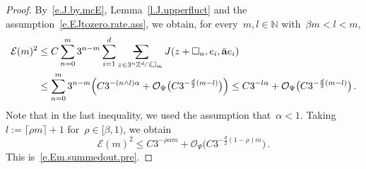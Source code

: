 \documentclass[11pt,twoside]{article} %
\makeatletter
\let\oldsquare\square %
\renewcommand{\square}{\oldsquare}
\numberwithin{equation}{section}
\theoremstyle{definition}
\newcommand*{\N}{\ensuremath{\mathbb{N}}}
\newcommand*{\Zd}{\ensuremath{\mathbb{Z}^d}}
\renewcommand{\a}{\mathbf{a}}
\newcommand{\ahom}{\bar{\a}}
\newcommand{\cu}{\square}
\renewcommand{\O}{\mathcal{O}}
\newcommand{\avsum}{\mathop{\mathpalette\avsuminner\relax}\displaylimits}
\newcommand\avsuminner[2]{%
  {\sbox0{$\m@th#1\sum$}%
   \vphantom{\usebox0}%
   \ooalign{%
     \hidewidth
     \smash{\,\rule[.23em]{8.8pt}{1.1pt} \relax}%
     \hidewidth\cr
   ~$\m@th#1\sum$\cr
   }%
  }%
}
\makeatother
\begin{document}
\begin{proof}
By~\eqref{e.J.by.mcE}, Lemma~\ref{l.J.upperfluct} and the assumption~\eqref{e.EJtozero.rate.ass}, we obtain, for every~$m,l \in \N$ with~$\beta m < l < m$,
\begin{align}
\label{e.Emestimate}
\mathcal{E}(m)^2
&
\leq
C\sum_{n=0}^{m}
3^{n-m} \sum_{i=1}^d \avsum_{z \in 3^n\Zd\cap \cu_m} 
 J(z+\cu_n,e_i,\ahom e_i)
\notag \\ & 
\leq 
\sum_{n=0}^{m}
3^{n-m}
\Bigl( 
C3^{-(n\wedge l)\alpha} 
+
\O_\Psi \bigl( C3^{-\frac d2(m-l)} \bigr)
\Bigr)
\leq
C3^{-l\alpha} + \O_\Psi \bigl( C3^{-\frac d2(m-l)} \bigr)
\,.
\end{align}
Note that in the last inequality, we used the assumption that~$\alpha<1$. Taking~$l:= \lceil \rho m\rceil +1$ for~$\rho \in [\beta,1)$, we obtain
\begin{equation}
\label{e.mathEsqr.bound}
\mathcal{E}(m)^2
\leq 
C3^{-\rho \alpha m } + \O_\Psi\bigl( C 3^{-\frac d2(1-\rho)m} \bigr) \,.
\end{equation}
This is~\eqref{e.Em.summedout.pre}. 

\smallskip 


\end{proof}
\end{document}
